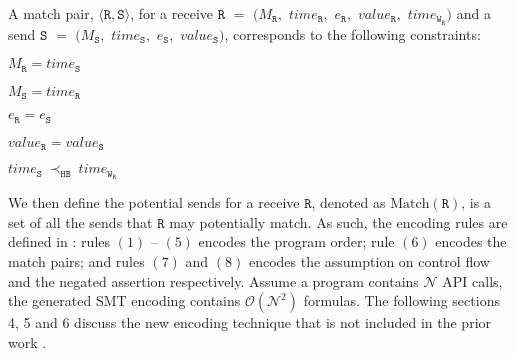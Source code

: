 \begin{definition} \label{def:match}
A match pair, $\langle\mathtt{R}, \mathtt{S}\rangle$, for a receive 
$\mathtt{R}$ $=$ $(M_\mathtt{R},$ $\mathit{time}_\mathtt{R},$ $e_\mathtt{R},$ $\mathit{value}_\mathtt{R},$ $\mathit{time}_{\mathtt{W}_\mathtt{R}})$ and a send $\mathtt{S}$ $=$ $(M_\mathtt{S},$ $\mathit{time}_\mathtt{S},$ $e_\mathtt{S},$ $\mathit{value}_\mathtt{S})$, corresponds to the following constraints:
\begin{compactenum}
\item $M_{\mathtt{R}} = \mathit{time}_{\mathtt{S}}$
\item $M_{\mathtt{S}} = \mathit{time}_{\mathtt{R}}$
\item $e_{\mathtt{R}} = e_{\mathtt{S}}$
\item $\mathit{value}_{\mathtt{R}} = \mathit{value}_{\mathtt{S}}$ 
\item $\mathit{time}_{\mathtt{S}}\ \mathrm{\prec_\mathtt{HB}}\ \mathit{time}_{\mathtt{W}_\mathtt{R}}$
\end{compactenum}
\end{definition}

We then define the potential sends for a receive $\mathtt{R}$, denoted as $\mathrm{Match}(\mathtt{R})$, is a set of all the sends that $\mathtt{R}$ may potentially match. As such, the encoding rules are defined in : rules $(1)$ -- $(5)$ encodes the program order; rule $(6)$ encodes the match pairs; and rules $(7)$ and $(8)$ encodes the assumption on control flow and the negated assertion respectively. Assume a program contains $\mathcal{N}$ API calls, the generated SMT encoding contains $\mathcal{O}(\mathcal{N}^2)$ formulas. The following sections 4, 5 and 6 discuss the new encoding technique that is not included in the prior work \cite{DBLP:conf/kbse/HuangMM13}.  

\encodingptp